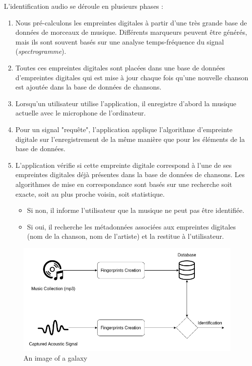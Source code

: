 \documentclass[11pt, report, french]{scrreprt}
\begin{document}
L’identification audio se déroule en plusieurs phases :\\
\begin{enumerate}
	
	\item   Nous pré-calculons les empreintes digitales à partir d'une très grande base de données de morceaux de musique.
	 Différents marqueurs peuvent être générés, mais ils sont souvent basés sur une analyse temps-fréquence du signal (\textit{spectrogramme}).
	\item	Toutes ces empreintes digitales sont placées dans une base de données d'empreintes digitales qui est mise à jour chaque fois qu'une nouvelle chanson est ajoutée dans la base de données de chansons.
	\item   Lorsqu'un utilisateur utilise l'application, il enregistre d'abord la musique actuelle avec le microphone de l’ordinateur.
	\item	Pour un signal "requête", l’application applique l’algorithme d'empreinte digitale sur l'enregistrement de la même manière que pour les éléments de la base de données.
	\item   L'application vérifie si cette empreinte digitale correspond à l'une de ses empreintes digitales déjà présentes dans la base de données de chansons. Les algorithmes de mise en correspondance sont basés sur une recherche soit exacte, soit au plus proche voisin, soit statistique.\begin{itemize}
		\item Si non, il informe l'utilisateur que la musique ne peut pas être identifiée. 
		\item Si oui, il recherche les métadonnées associées aux empreintes digitales (nom de la chanson, nom de l’artiste) et la restitue à l'utilisateur.
	\end{itemize}
\end{enumerate}

\begin{figure}[htp]
	\centering
	\includegraphics[scale=0.5]{img/general_schema2.png}
	\caption{An image of a galaxy}
\end{figure}
\end{document}
